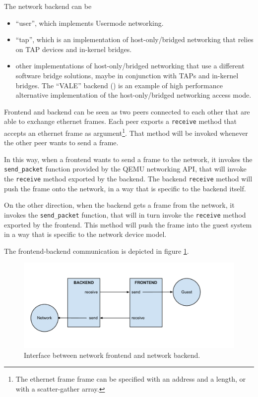 The network backend can be
\begin{itemize}
    \item ``user'', which implements Usermode networking.
    \item ``tap'', which is an implementation of host-only/bridged networking that relies on TAP devices and in-kernel bridges.
    \item other implementations of host-only/bridged networking that use a different software bridge solutions, maybe in conjunction
	  with TAPs and in-kernel bridges. The ``VALE'' backend (\cite{ref:vale}) is an example of high performance alternative 
	  implementation of the host-only/bridged networking access mode.
\end{itemize}

\vspace{0.5cm}

Frontend and backend can be seen as two peers connected to each other that are able to exchange ethernet frames. Each peer exports a 
\texttt{receive} method that accepts an ethernet frame as argument\footnote{The ethernet frame frame can be specified with an address 
and a length, or with a scatter-gather array.}. That method will be invoked whenever the other peer wants to send a frame.

In this way, when a frontend wants to send a frame to the network, it invokes the \texttt{send\_packet} function provided by the QEMU
networking API, that will invoke the \texttt{receive} method exported by the backend. The backend \texttt{receive} method will push the
frame onto the network, in a way that is specific to the backend itself.

On the other direction, when the backend gets a frame from the network, it invokes the \texttt{send\_packet} function, that will in turn
invoke the \texttt{receive} method exported by the frontend. This method will push the frame into the guest system in a way that is
specific to the network device model.

The frontend-backend communication is depicted in figure \ref{fig:frontback}.

\begin{figure}[bt]
\centering
\includegraphics[scale = 0.60]{frontend-backend.pdf}
\caption{Interface between network frontend and network backend.}
\label{fig:frontback}
\end{figure}



